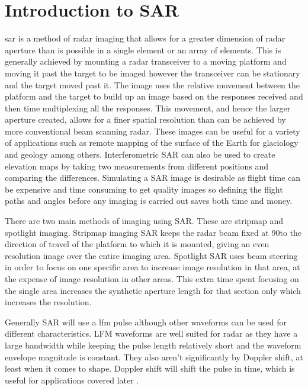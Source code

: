\section{Introduction to SAR}

\gls{sar} is a method of radar imaging that allows for a greater dimension of radar aperture than is possible in a single element or an array of elements. This is generally achieved by mounting a radar transceiver to a moving platform and moving it past the target to be imaged however the transceiver can be stationary and the target moved past it. The image uses the relative movement between the platform and the target to build up an image based on the responses received and then time multiplexing all the responses. This movement, and hence the larger aperture created, allows for a finer spatial resolution than can be achieved by more conventional beam scanning radar. These images can be useful for a variety of applications such as remote mapping of the surface of the Earth for glaciology and geology among others. Interferometric SAR can also be used to create elevation maps by taking two measurements from different positions and comparing the differences.
Simulating a SAR image is desirable as flight time can be expensive and time consuming to get quality images so defining the flight paths and angles before any imaging is carried out saves both time and money. \par
There are two main methods of imaging using SAR. These are stripmap and spotlight imaging. Stripmap imaging SAR keeps the radar beam fixed at 90\degree to the direction of travel of the platform to which it is mounted, giving an even resolution image over the entire imaging area. Spotlight SAR uses beam steering in order to focus on one specific area to increase image resolution in that area, at the expense of image resolution in other areas. This extra time spent focusing on the single area increases the synthetic aperture length for that section only which increases the resolution.\par
Generally SAR will use a \gls{lfm} pulse although other waveforms can be used for different characteristics. LFM waveforms are well suited for radar as they have a large bandwidth while keeping the pulse length relatively short and the waveform envelope magnitude is constant. They also aren't significantly by Doppler shift, at least when it comes to shape. Doppler shift will shift the pulse in time, which is useful for applications covered later \cite{duerschBackprojectionSyntheticAperture2013}.

